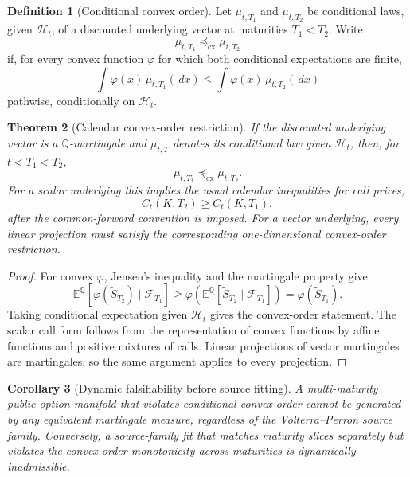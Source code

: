 \documentclass[11pt,a4paper]{amsart}
\theoremstyle{plain}
\newtheorem{theorem}{Theorem}[section]
\newtheorem{corollary}[theorem]{Corollary}
\theoremstyle{definition}
\newtheorem{definition}[theorem]{Definition}
\theoremstyle{remark}
\newcommand{\QQ}{\mathbb{Q}}
\newcommand{\EE}{\mathbb{E}}
\newcommand{\cF}{\mathcal{F}}
\newcommand{\cH}{\mathcal{H}}
\newcommand{\dd}{\,d}
\begin{document}
\begin{definition}[Conditional convex order]\label{def:conditional-convex-order}
Let \(\mu_{t,T_1}\) and \(\mu_{t,T_2}\) be conditional laws, given \(\cH_t\), of a discounted
underlying vector at maturities \(T_1<T_2\).  Write
\[
        \mu_{t,T_1}\preceq_{\mathrm{cx}}\mu_{t,T_2}
\]
if, for every convex function \(\varphi\) for which both conditional expectations are finite,
\[
        \int \varphi(x)\,\mu_{t,T_1}(\dd x)
        \le
        \int \varphi(x)\,\mu_{t,T_2}(\dd x)
\]
pathwise, conditionally on \(\cH_t\).
\end{definition}

\begin{theorem}[Calendar convex-order restriction]\label{thm:calendar-convex-order}
If the discounted underlying vector is a \(\QQ\)-martingale and \(\mu_{t,T}\) denotes its
conditional law given \(\cH_t\), then, for \(t<T_1<T_2\),
\[
        \mu_{t,T_1}\preceq_{\mathrm{cx}}\mu_{t,T_2}.
\]
For a scalar underlying this implies the usual calendar inequalities for call prices,
\[
        C_t(K,T_2)\ge C_t(K,T_1),
\]
after the common-forward convention is imposed.  For a vector underlying, every linear projection
must satisfy the corresponding one-dimensional convex-order restriction.
\end{theorem}

\begin{proof}
For convex \(\varphi\), Jensen's inequality and the martingale property give
\[
        \EE^\QQ[\varphi(\widetilde S_{T_2})\mid\cF_{T_1}]
        \ge
        \varphi(\EE^\QQ[\widetilde S_{T_2}\mid\cF_{T_1}])
        =
        \varphi(\widetilde S_{T_1}).
\]
Taking conditional expectation given \(\cH_t\) gives the convex-order statement.  The scalar call
form follows from the representation of convex functions by affine functions and positive
mixtures of calls.  Linear projections of vector martingales are martingales, so the same
argument applies to every projection.
\end{proof}

\begin{corollary}[Dynamic falsifiability before source fitting]\label{cor:convex-order-falsifiability}
A multi-maturity public option manifold that violates conditional convex order cannot be
generated by any equivalent martingale measure, regardless of the Volterra--Perron source
family.  Conversely, a source-family fit that matches maturity slices separately but violates
the convex-order monotonicity across maturities is dynamically inadmissible.
\end{corollary}
\end{document}

